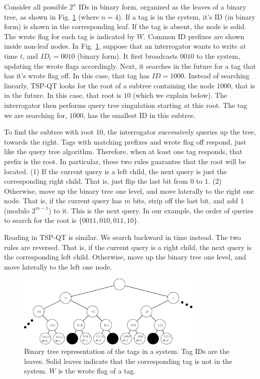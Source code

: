 \documentclass[conference]{IEEEtran}
\begin{document}
Consider all possible $2^n$ IDs in binary form, organized as the leaves of a binary tree, as shown in Fig. \ref{fig:tree} (where $n = 4$).  If a tag is in the system, it's ID (in binary form) is shown in the corresponding leaf.  If the tag is absent, the node is solid.  The wrote flag for each tag is indicated by $W$.  Common ID prefixes are shown inside non-leaf nodes.  In Fig. \ref{fig:tree}, suppose that an interrogator wants to write at time $t$, and $ID_t = 0010$ (binary form).   It first broadcasts $0010$ to the system, updating the wrote flags accordingly.  Next, it searches in the future for a tag that has it's wrote flag off.  In this case, that tag has $ID = 1000$.  Instead of searching linearly, TSP-QT looks for the root of a subtree containing the node $1000$, that is in the future.  In this case, that root is $10$ (which we explain below).  The interrogator then performs query tree singulation \cite{conf:Law01} starting at this root.  The tag we are searching for, $1000$, has the smallest ID in this subtree.

To find the subtree with root $10$, the interrogator successively queries up the tree, towards the right.  Tags with matching prefixes and wrote flag off respond, just like the query tree algorithm.  Therefore, when at least one tag responds, that prefix is the root.  In particular, these two rules guarantee that the root will be located.  (1) If the current query is a left child, the next query is just the corresponding right child.  That is, just flip the last bit from $0$ to $1$.  (2) Otherwise, move up the binary tree one level, and move laterally to the right one node.  That is, if the current query has $m$ bits, strip off the last bit, and add $1$ (modulo $2^{m-1}$) to it.  This is the next query.  In our example, the order of queries to search for the root is $\{0011, 010, 011, 10\}$.

Reading in TSP-QT is similar.  We search backward in time instead.  The two rules are reversed.  That is, if the current query is a right child, the next query is the corresponding left child.  Otherwise, move up the binary tree one level, and move laterally to the left one node.


\begin{figure}
\centering
\includegraphics[width=3.5in]{query_tree.eps}
\caption{Binary tree representation of the tags in a system.  Tag IDs are the leaves.  Solid leaves indicate that the corresponding tag is not in the system.  $W$ is the wrote flag of a tag.\label{fig:tree}}
\end{figure}
\end{document}
